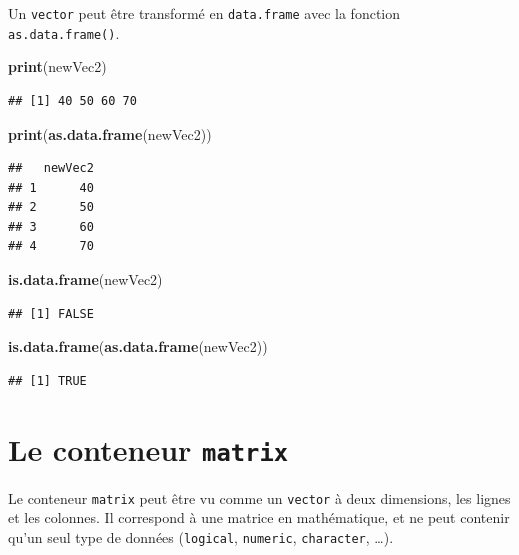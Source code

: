 \documentclass[]{book}
\newenvironment{Shaded}{\begin{snugshade}}{\end{snugshade}}
\newcommand{\KeywordTok}[1]{\textcolor[rgb]{0.13,0.29,0.53}{\textbf{#1}}}
\newcommand{\NormalTok}[1]{#1}
\begin{document}
Un \texttt{vector} peut être transformé en \texttt{data.frame} avec la fonction \texttt{as.data.frame()}.

\begin{Shaded}
\begin{Highlighting}[]
\KeywordTok{print}\NormalTok{(newVec2)}
\end{Highlighting}
\end{Shaded}

\begin{verbatim}
## [1] 40 50 60 70
\end{verbatim}

\begin{Shaded}
\begin{Highlighting}[]
\KeywordTok{print}\NormalTok{(}\KeywordTok{as.data.frame}\NormalTok{(newVec2))}
\end{Highlighting}
\end{Shaded}

\begin{verbatim}
##   newVec2
## 1      40
## 2      50
## 3      60
## 4      70
\end{verbatim}

\begin{Shaded}
\begin{Highlighting}[]
\KeywordTok{is.data.frame}\NormalTok{(newVec2)}
\end{Highlighting}
\end{Shaded}

\begin{verbatim}
## [1] FALSE
\end{verbatim}

\begin{Shaded}
\begin{Highlighting}[]
\KeywordTok{is.data.frame}\NormalTok{(}\KeywordTok{as.data.frame}\NormalTok{(newVec2))}
\end{Highlighting}
\end{Shaded}

\begin{verbatim}
## [1] TRUE
\end{verbatim}

\hypertarget{l014matrix}{%
\section{\texorpdfstring{Le conteneur \texttt{matrix}}{Le conteneur matrix}}\label{l014matrix}}

Le conteneur \texttt{matrix} peut être vu comme un \texttt{vector} à deux dimensions, les lignes et les colonnes. Il correspond à une matrice en mathématique, et ne peut contenir qu'un seul type de données (\texttt{logical}, \texttt{numeric}, \texttt{character}, \ldots).
\end{document}
